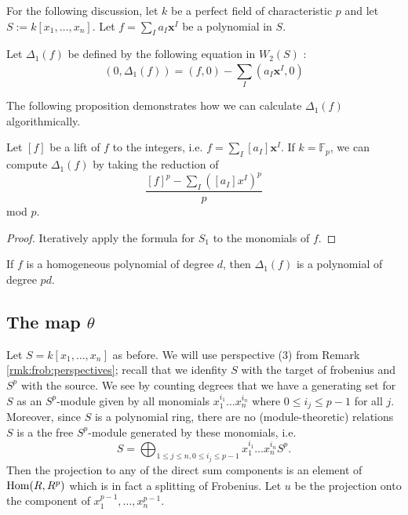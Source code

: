 For the following discussion, 
let \(k\) be a perfect field of characteristic \(p\) and 
let \(S := k[x_{1}, \ldots, x_{n}]\).
Let \(f = \sum_{I}^{} a_{I}\mathbf{x}^{I}\) be a polynomial in \(S\).

\begin{defn}
	Let \(\Delta_{1}(f)\)
	be defined by the following equation in \(W_{2}(S)\) :
	\[
		(0, \Delta_{1}(f)) = (f,0) - \sum_{I}^{} (a_{I}\mathbf{x}^{I}, 0) 
	\] 
\end{defn}

The following proposition demonstrates how we can calculate 
\(\Delta_{1}(f)\) algorithmically.

\begin{prop}
	\label{prop:delta1:formula}
	Let \([f]\) be a lift of \(f\) to the integers,
	i.e.
	\(f = \sum_{I}^{} [a_{I}] \mathbf{x}^{I}\).
	If \(k = \mathbb{F}_{p}\),
	we can compute \(\Delta_{1}(f)\) by 
	taking the reduction of
	\[
		\frac{[f]^{p} - \sum_{I}^{} ([a_{I}]x^{I})^{p} }{p}
	\] 
	mod \(p\).
\end{prop}

\begin{proof}
	Iteratively apply the formula for \(S_{1}\) 
	to the monomials of \(f\).
\end{proof}

\begin{rmk}
	If \(f\) is a homogeneous polynomial of degree \(d\), 
	then \(\Delta_{1}(f)\) is a polynomial of degree \(pd\).
\end{rmk}

\subsection{The map \(\theta\)}

Let \(S = k[x_{1}, \ldots, x_{n}]\) as before. 
We will use perspective (3) from
Remark \ref{rmk:frob:perspectives}; 
recall that we idenfity 
\(S\) with the target of frobenius and
\(S^{p}\) with the source.
We see 
by counting degrees
that we have a generating set for \(S\) as an
\(S^{p}\)-module given by
all monomials
\(x_{1}^{i_{1}}\ldots x_{n}^{i_{n}}\)
where \(0 \leq i_{j} \leq p-1\) for all \(j\).
Moreover, since \(S\) is a polynomial ring, 
there are no (module-theoretic) relations
\(S\) is a the free \(S^{p}\)-module generated by 
these monomials, i.e.
\[
S = \bigoplus_{1 \leq j \leq n, 0 \leq i_{j} \leq p-1}^{} x_{1}^{i_{1}}\ldots x_{n}^{i_{n}} S^{p}
.\] 
Then the projection to any of the direct sum components
is an element of \(\operatorname{Hom}(R,R^{p})\) which is in fact a
splitting of Frobenius.
Let \(u\) be the projection onto the component of
\(x_{1}^{p-1}, \ldots, x_{n}^{p-1}\).

